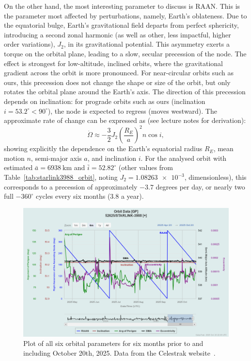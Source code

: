 \documentclass{article}
\begin{document}
On the other hand, the most interesting parameter to discuss is RAAN. This is the parameter most affected by perturbations, namely, Earth’s oblateness. Due to the equatorial bulge, Earth’s gravitational field departs from perfect sphericity, introducing a second zonal harmonic (as well as other, less impactful, higher order variations), \( J_{2} \), in its gravitational potential. This asymmetry exerts a torque on the orbital plane, leading to a slow, secular precession of the node. The effect is strongest for low-altitude, inclined orbits, where the gravitational gradient across the orbit is more pronounced. For near-circular orbits such as ours, this precession does not change the shape or size of the orbit, but only rotates the orbital plane around the Earth’s axis. The direction of this precession depends on inclination: for prograde orbits such as ours (inclination \( i = 53.2^{\circ} < 90^{\circ} \)), the node is expected to regress (moves westward). The approximate rate of change can be expressed as (see lecture notes for derivation):
\[
\dot{\Omega} \approx -\frac{3}{2}J_{2}\left(\frac{R_{E}}{a}\right)^{2}n\cos i,
\]  
showing explicitly the dependence on the Earth’s equatorial radius \( R_{E} \), mean motion \( n \), semi-major axis \( a \), and inclination \( i \). For the analysed orbit with estimated \( \bar{a} = 6938~\text{km} \) and \( \bar{i} = 52.82^{\circ} \) (other values from Table~\ref{tab:starlink3988_orbit}, noting $J_2 = \num{1.08263e-3}$, dimensionless), this corresponds to a precession of approximately $-3.7$ degrees per day, or nearly two full $-360^{\circ}$ cycles every six months (3.8 a year).

\begin{figure}[h]
    \centering
    \includegraphics[width=\linewidth]{LaTeX/Figures/Orbit-Data-Starlink-3988.png}
    \caption{Plot of all six orbital parameters for six months prior to and including October 20th, 2025. Data from the Celestrak website~\cite{CelesTrak}.}
    \label{fig:parameters_plot_celestrak}
\end{figure}
\end{document}
